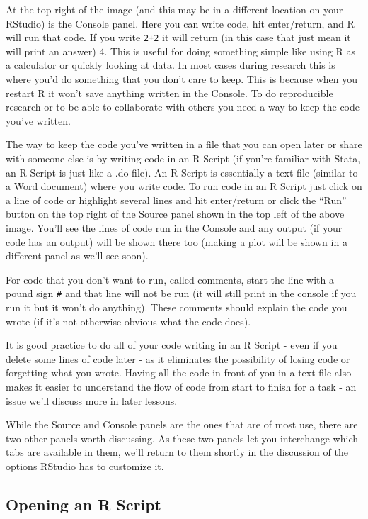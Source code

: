 \documentclass[
]{krantz}
\begin{document}
At the top right of the image (and this may be in a
different location on your RStudio) is the Console panel.
Here you can write code, hit enter/return, and R will run
that code. If you write \texttt{2+2} it will return (in this
case that just mean it will print an answer) 4. This is
useful for doing something simple like using R as a
calculator or quickly looking at data. In most cases during
research this is where you'd do something that you don't
care to keep. This is because when you restart R it won't
save anything written in the Console. To do reproducible
research or to be able to collaborate with others you need a
way to keep the code you've written.

The way to keep the code you've written in a file that you
can open later or share with someone else is by writing code
in an R Script (if you're familiar with Stata, an R Script
is just like a .do file). An R Script is essentially a text
file (similar to a Word document) where you write code. To
run code in an R Script just click on a line of code or
highlight several lines and hit enter/return or click the
``Run'' button on the top right of the Source panel shown in
the top left of the above image. You'll see the lines of
code run in the Console and any output (if your code has an
output) will be shown there too (making a plot will be shown
in a different panel as we'll see soon).

For code that you don't want to run, called comments, start
the line with a pound sign \texttt{\#} and that line will
not be run (it will still print in the console if you run it
but it won't do anything). These comments should explain the
code you wrote (if it's not otherwise obvious what the code
does).

It is good practice to do all of your code writing in an R
Script - even if you delete some lines of code later - as it
eliminates the possibility of losing code or forgetting what
you wrote. Having all the code in front of you in a text
file also makes it easier to understand the flow of code
from start to finish for a task - an issue we'll discuss
more in later lessons.

While the Source and Console panels are the ones that are of
most use, there are two other panels worth discussing. As
these two panels let you interchange which tabs are
available in them, we'll return to them shortly in the
discussion of the options RStudio has to customize it.

\hypertarget{opening-an-r-script}{%
\subsection{Opening an R Script}\label{opening-an-r-script}}
\end{document}
